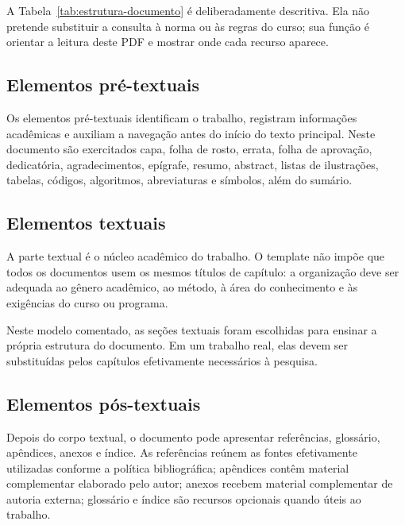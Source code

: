 A Tabela~\ref{tab:estrutura-documento} é deliberadamente descritiva. Ela não pretende substituir a consulta à norma ou às regras do curso; sua função é orientar a leitura deste PDF e mostrar onde cada recurso aparece.

\subsection{Elementos pré-textuais}

Os elementos pré-textuais identificam o trabalho, registram informações acadêmicas e auxiliam a navegação antes do início do texto principal. Neste documento são exercitados capa, folha de rosto, errata, folha de aprovação, dedicatória, agradecimentos, epígrafe, resumo, abstract, listas de ilustrações, tabelas, códigos, algoritmos, abreviaturas e símbolos, além do sumário.


\subsection{Elementos textuais}

A parte textual é o núcleo acadêmico do trabalho. O template não impõe que todos os documentos usem os mesmos títulos de capítulo: a organização deve ser adequada ao gênero acadêmico, ao método, à área do conhecimento e às exigências do curso ou programa.

Neste modelo comentado, as seções textuais foram escolhidas para ensinar a própria estrutura do documento. Em um trabalho real, elas devem ser substituídas pelos capítulos efetivamente necessários à pesquisa.


\subsection{Elementos pós-textuais}

Depois do corpo textual, o documento pode apresentar referências, glossário, apêndices, anexos e índice. As referências reúnem as fontes efetivamente utilizadas conforme a política bibliográfica; apêndices contêm material complementar elaborado pelo autor; anexos recebem material complementar de autoria externa; glossário e índice são recursos opcionais quando úteis ao trabalho.


